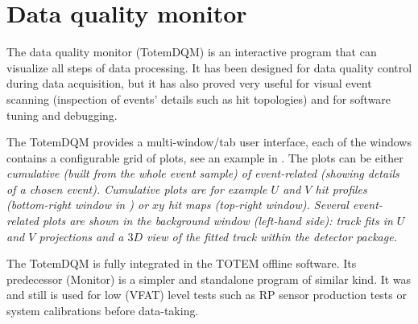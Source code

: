 


\section[dqm]{Data quality monitor}

The data quality monitor (TotemDQM) is an interactive program that can visualize all steps of data processing. It has been designed for data quality control during data acquisition, but it has also proved very useful for visual event scanning (inspection of events' details such as hit topologies) and for software tuning and debugging.

The TotemDQM provides a multi-window/tab user interface, each of the windows contains a configurable grid of plots, see an example in . The plots can be either \em{cumulative} (built from the whole event sample) of \em{event-related} (showing details of a chosen event). Cumulative plots are for example $U$ and $V$ hit profiles (bottom-right window in ) or $xy$ hit maps (top-right window). Several event-related plots are shown in the background window (left-hand side): track fits in $U$ and $V$ projections and a $3D$ view of the fitted track within the detector package.



The TotemDQM is fully integrated in the TOTEM offline software. Its predecessor (Monitor) is a simpler and standalone program of similar kind. It was and still is used for low (VFAT) level tests such as RP sensor production tests or system calibrations before data-taking.
